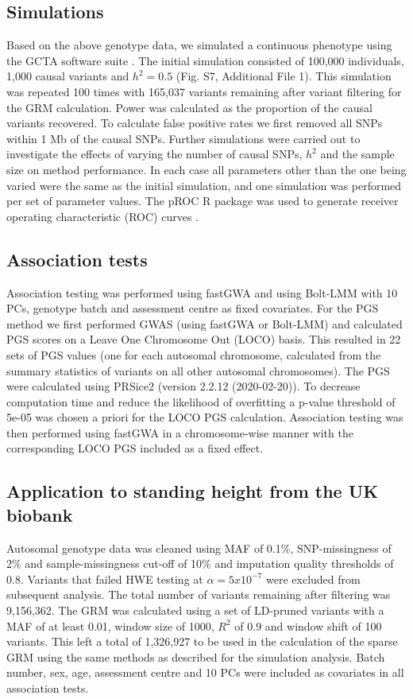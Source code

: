 \documentclass[fleqn,10pt]{wlscirep}
\begin{document}
\subsection*{Simulations} 
Based on the above genotype data, we simulated a continuous phenotype using the GCTA software suite \cite{yang2011gcta}. The initial simulation consisted of 100,000 individuals, 1,000 causal variants and $h^2 = 0.5$ (Fig. S7, Additional File 1). This simulation was repeated 100 times with 165,037 variants remaining after variant filtering for the GRM calculation. Power was calculated as the proportion of the causal variants recovered. To calculate false positive rates we first removed all SNPs within 1 Mb of the causal SNPs. Further simulations were carried out to investigate the effects of varying the number of causal SNPs, $h^2$ and the sample size on method performance. In each case all parameters other than the one being varied were the same as the initial simulation, and one simulation was performed per set of parameter values. The pROC R package was used to generate receiver operating characteristic (ROC) curves \cite{robin2011proc}. 

\subsection*{Association tests} 
Association testing was performed using fastGWA and using Bolt-LMM with 10 PCs, genotype batch and assessment centre as fixed covariates. For the PGS method we first performed GWAS (using fastGWA or Bolt-LMM) and calculated PGS scores on a Leave One Chromosome Out (LOCO) basis. This resulted in 22 sets of PGS values (one for each autosomal chromosome, calculated from the summary statistics of variants on all other autosomal chromosomes). The PGS were calculated using PRSice2 (version 2.2.12 (2020-02-20))\cite{choi2019prsice}. To decrease computation time and reduce the likelihood of overfitting a p-value threshold of 5e-05 was chosen a priori for the LOCO PGS calculation. Association testing was then performed using fastGWA in a chromosome-wise manner with the corresponding LOCO PGS included as a fixed effect.  

\subsection*{Application to standing height from the UK biobank} 
Autosomal genotype data was cleaned using MAF of 0.1\%, SNP-missingness of 2\% and sample-missingness cut-off of 10\% and imputation quality thresholds of 0.8. Variants that failed HWE testing at $\alpha{=5x10^{-7}}$ were excluded from subsequent analysis. The total number of variants remaining after filtering was 9,156,362. The GRM was calculated using a set of LD-pruned variants with a MAF of at least 0.01, window size of 1000, $R^2$ of 0.9 and window shift of 100 variants. This left a total of 1,326,927 to be used in the calculation of the sparse GRM using the same methods as described for the simulation analysis. Batch number, sex, age, assessment centre and 10 PCs were included as covariates in all association tests.
\end{document}
